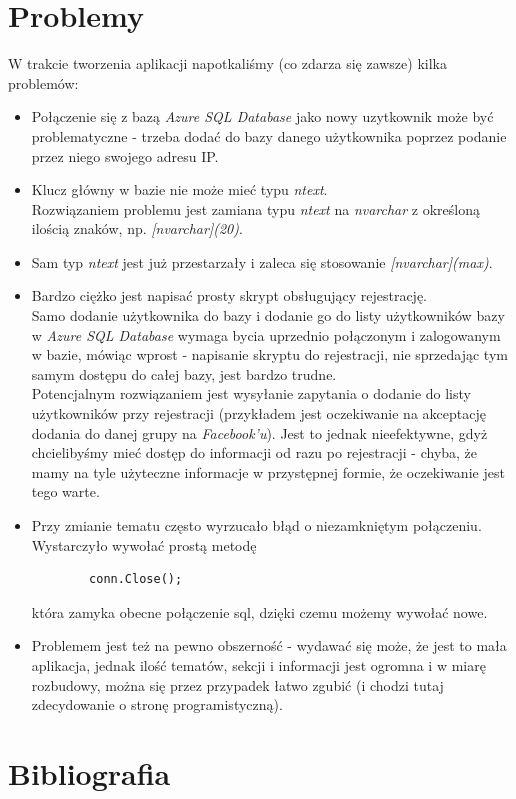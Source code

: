 \documentclass{article}
\begin{document}
\newpage
\section{Problemy}
W trakcie tworzenia aplikacji napotkaliśmy (co zdarza się zawsze) kilka problemów:
\begin{itemize}
    \item Połączenie się z bazą \textit{Azure SQL Database} jako nowy uzytkownik może być problematyczne - trzeba dodać do bazy danego użytkownika poprzez podanie przez niego swojego adresu IP.
    \item Klucz główny w bazie nie może mieć typu \textit{ntext}.
    \\Rozwiązaniem problemu jest zamiana typu \textit{ntext} na \textit{nvarchar} z określoną ilością znaków, np. \textit{[nvarchar](20)}.
    \item Sam typ \textit{ntext} jest już przestarzały i zaleca się stosowanie \textit{[nvarchar](max)}.
    \item Bardzo ciężko jest napisać prosty skrypt obsługujący rejestrację.
    \\Samo dodanie użytkownika do bazy i dodanie go do listy użytkowników bazy w \textit{Azure SQL Database} wymaga bycia uprzednio połączonym i zalogowanym w bazie, mówiąc wprost - napisanie skryptu do rejestracji, nie sprzedając tym samym dostępu do całej bazy, jest bardzo trudne.
    \\Potencjalnym rozwiązaniem jest wysyłanie zapytania o dodanie do listy użytkowników przy rejestracji (przykładem jest oczekiwanie na akceptację dodania do danej grupy na \textit{Facebook'u}). Jest to jednak nieefektywne, gdyż chcielibyśmy mieć dostęp do informacji od razu po rejestracji - chyba, że mamy na tyle użyteczne informacje w przystępnej formie, że oczekiwanie jest tego warte.
    \item Przy zmianie tematu często wyrzucało błąd o niezamkniętym połączeniu.
    \\Wystarczyło wywołać prostą metodę
    \begin{verbatim}
        conn.Close();
    \end{verbatim}
    która zamyka obecne połączenie sql, dzięki czemu możemy wywołać nowe.
    \item Problemem jest też na pewno obszerność - wydawać się może, że jest to mała aplikacja, jednak ilość tematów, sekcji i informacji jest ogromna i w miarę rozbudowy, można się przez przypadek łatwo zgubić (i chodzi tutaj zdecydowanie o stronę programistyczną).
\end{itemize}

\section{Bibliografia}
\end{document}
